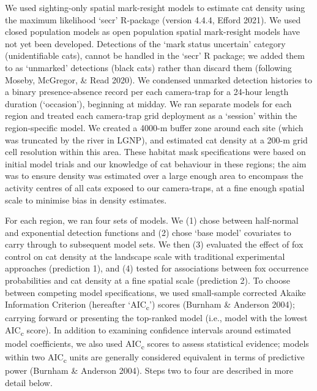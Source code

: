 \documentclass[preprint, 3p, authoryear]{elsarticle} %
\begin{document}
We used sighting-only spatial mark-resight models to estimate cat density using the maximum likelihood `secr' R-package (version 4.4.4, Efford 2021). We used closed population models as open population spatial mark-resight models have not yet been developed. Detections of the `mark status uncertain' category (unidentifiable cats), cannot be handled in the `secr' R package; we added them to as `unmarked' detections (black cats) rather than discard them (following Moseby, McGregor, \& Read 2020). We condensed unmarked detection histories to a binary presence-absence record per each camera-trap for a 24-hour length duration (`occasion'), beginning at midday. We ran separate models for each region and treated each camera-trap grid deployment as a `session' within the region-specific model. We created a 4000-m buffer zone around each site (which was truncated by the river in LGNP), and estimated cat density at a 200-m grid cell resolution within this area. These habitat mask specifications were based on initial model trials and our knowledge of cat behaviour in these regions; the aim was to ensure density was estimated over a large enough area to encompass the activity centres of all cats exposed to our camera-traps, at a fine enough spatial scale to minimise bias in density estimates.

For each region, we ran four sets of models. We (1) chose between half-normal and exponential detection functions and (2) chose `base model' covariates to carry through to subsequent model sets. We then (3) evaluated the effect of fox control on cat density at the landscape scale with traditional experimental approaches (prediction 1), and (4) tested for associations between fox occurrence probabilities and cat density at a fine spatial scale (prediction 2). To choose between competing model specifications, we used small-sample corrected Akaike Information Criterion (hereafter `AIC\textsubscript{c}') scores (Burnham \& Anderson 2004); carrying forward or presenting the top-ranked model (i.e., model with the lowest AIC\textsubscript{c} score). In addition to examining confidence intervals around estimated model coefficients, we also used AIC\textsubscript{c} scores to assess statistical evidence; models within two AIC\textsubscript{c} units are generally considered equivalent in terms of predictive power (Burnham \& Anderson 2004). Steps two to four are described in more detail below.
\end{document}
